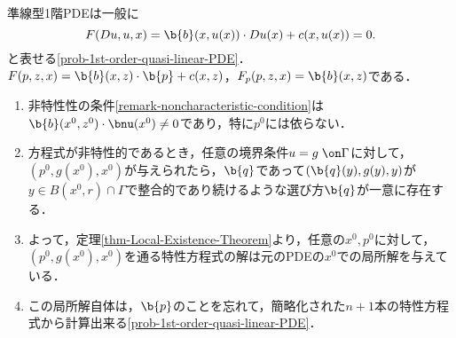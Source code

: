 \documentclass[uplatex,dvipdfmx]{jsreport}
\begin{document}
\begin{problem}
    準線型1階PDEは一般に
    \[F(Du,u,x)=\b{b}(x,u(x))\cdot Du(x)+c(x,u(x))=0.\]
    と表せる\ref{prob-1st-order-quasi-linear-PDE}．$F(p,z,x)=\b{b}(x,z)\cdot\b{p}+c(x,z)$，$F_p(p,z,x)=\b{b}(x,z)$である．
    \begin{enumerate}
        \item 非特性性の条件\ref{remark-noncharacteristic-condition}は$\b{b}(x^0,z^0)\cdot\bnu(x^0)\ne0$であり，特に$p^0$には依らない．
        \item 方程式が非特性的であるとき，任意の境界条件$u=g\;\on\Gamma$に対して，$(p^0,g(x^0),x^0)$が与えられたら，$\b{q}$であって$(\b{q}(y),g(y),y)$が$y\in B(x^0,r)\cap\Gamma$で整合的であり続けるような選び方$\b{q}$が一意に存在する．
        \item よって，定理\ref{thm-Local-Existence-Theorem}より，任意の$x^0,p^0$に対して，$(p^0,g(x^0),x^0)$を通る特性方程式の解は元のPDEの$x^0$での局所解を与えている．
        \item この局所解自体は，$\b{p}$のことを忘れて，簡略化された$n+1$本の特性方程式から計算出来る\ref{prob-1st-order-quasi-linear-PDE}．
    \end{enumerate}
\end{problem}
\end{document}
